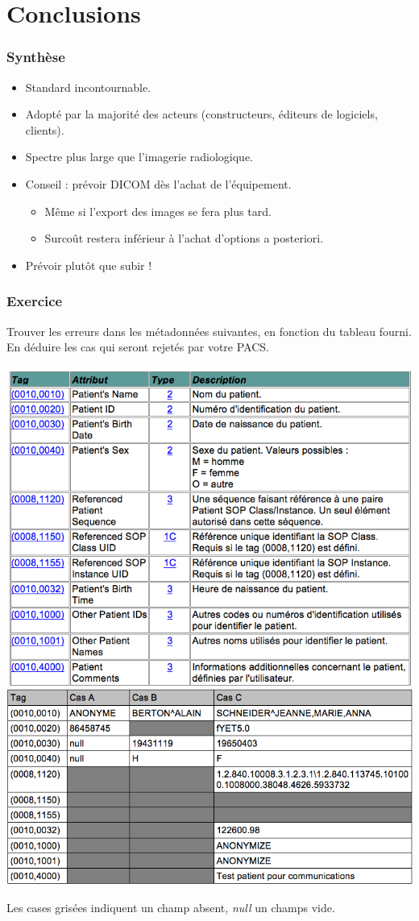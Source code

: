 \section{Conclusions}

\frame
{
	\frametitle{Synth\`ese}
	
	\begin{itemize}
		\item Standard incontournable.
		\item Adopt\'e par la majorit\'e des acteurs (constructeurs, \'editeurs de logiciels, clients).
		\item Spectre plus large que l'imagerie radiologique.
		\item Conseil : pr\'evoir DICOM d\`es l'achat de l'\'equipement.
		\begin{itemize}
			\item M\^eme si l'export des images se fera plus tard.
			\item Surco\^ut restera inf\'erieur \`a l'achat d'options a posteriori.
		\end{itemize}
		\item Pr\'evoir plut\^ot que subir !
	\end{itemize}
}

\frame
{
    \frametitle{Exercice}
    Trouver les erreurs dans les m\'etadonn\'ees suivantes, en fonction du tableau fourni.
    En d\'eduire les cas qui seront rejet\'es par votre PACS.

	\includegraphics[width=.5\linewidth]{./figures/table.png}
	\includegraphics[width=.5\linewidth]{./figures/metadata-cases.png}
    
    Les cases gris\'ees indiquent un champ absent, \emph{null} un champs vide.
}

